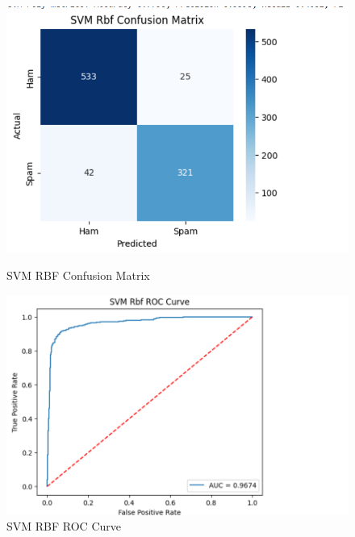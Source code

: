 \documentclass[12pt]{article}
\begin{document}
\begin{figure}[H]
\centering
\begin{minipage}{0.45\textwidth}
\centering
\includegraphics[width=\linewidth]{24.png}
\caption{SVM RBF Confusion Matrix}
\end{minipage}
\hfill
\begin{minipage}{0.45\textwidth}
\centering
\includegraphics[width=\linewidth]{25.png}
\caption{SVM RBF ROC Curve}
\end{minipage}
\end{figure}
\end{document}
